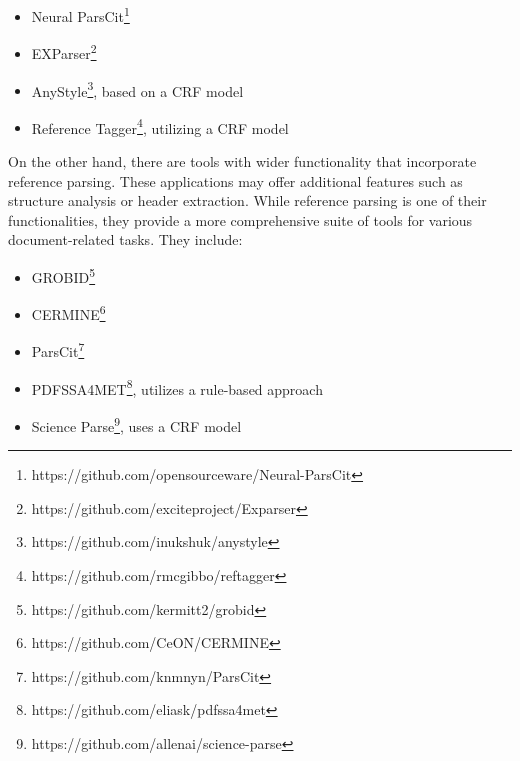 \begin{itemize}
    \item Neural ParsCit\footnote{https://github.com/opensourceware/Neural-ParsCit}
    \item EXParser\footnote{https://github.com/exciteproject/Exparser}
    \item AnyStyle\footnote{https://github.com/inukshuk/anystyle}, based on a CRF model
    \item Reference Tagger\footnote{https://github.com/rmcgibbo/reftagger}, utilizing a CRF model
\end{itemize}

On the other hand, there are tools with wider functionality that incorporate reference parsing. These applications may offer additional features such as structure analysis or header extraction. While reference parsing is one of their functionalities, they provide a more comprehensive suite of tools for various document-related tasks. They include:

\begin{itemize}
    \item GROBID\footnote{https://github.com/kermitt2/grobid}
    \item CERMINE\footnote{https://github.com/CeON/CERMINE}
    \item ParsCit\footnote{https://github.com/knmnyn/ParsCit}
    \item PDFSSA4MET\footnote{https://github.com/eliask/pdfssa4met}, utilizes a rule-based approach
    \item Science Parse\footnote{https://github.com/allenai/science-parse}, uses a CRF model
\end{itemize}

